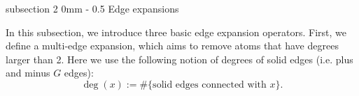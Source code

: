 \documentclass{article}
\makeatletter
\newcommand{\1}{\mathds{1}}
\numberwithin{equation}{section}
\newcommand{\be}{\begin{equation}}
\newcommand{\ee}{\end{equation}}
\theoremstyle{plain} %
\newtheorem{definition}[theorem]{Definition}
\theoremstyle{remark}
\renewcommand{\subsection}{\@startsection
{subsection}%
{2}%
{0mm}%
{-\baselineskip}%
{0.5\baselineskip}%
{\normalfont\bf\itshape}} %
\makeatother
\begin{document}
\subsection{Edge expansions} \label{sec localexp edge}


In this subsection, we introduce three basic edge expansion operators. First, we define a multi-edge expansion, which aims to remove atoms that have degrees larger than 2. Here we use the following notion of degrees of solid edges (i.e. plus and minus $G$ edges):
\be\label{degree}
{\deg}(x) := \# \{\text{solid edges connected with $x$}\} . 
\ee
\end{document}
